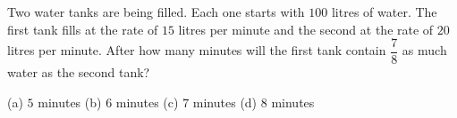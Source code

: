 Two water tanks are being filled. Each one starts with $100$ litres of water. The first tank fills at the rate of $15$ litres per minute and the second at the rate of $20$ litres per minute. After how many minutes will the first tank contain $\dfrac{7}{8}$ as much water as the second tank?

(a) $5$ minutes \quad (b) $6$ minutes \quad (c) $7$ minutes \quad (d) $8$ minutes
